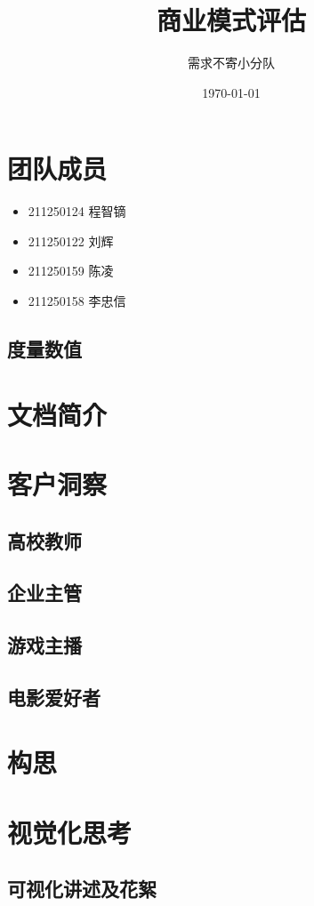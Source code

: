 \documentclass[a4paper,12pt]{article}
\title{商业模式评估}
\author{需求不寄小分队}
\date{\today}
\begin{document}
\maketitle

\tableofcontents

\section{团队成员}
\begin{itemize}
    \item 211250124 程智镝
    \item 211250122 刘辉
    \item 211250159 陈凌
    \item 211250158 李忠信
\end{itemize}

\subsection{度量数值}
    
\section{文档简介}
\section{客户洞察}
\subsection{高校教师}
\subsection{企业主管}
\subsection{游戏主播}
\subsection{电影爱好者}
\section{构思}
\section{视觉化思考}
\subsection{可视化讲述及花絮}
\end{document}
